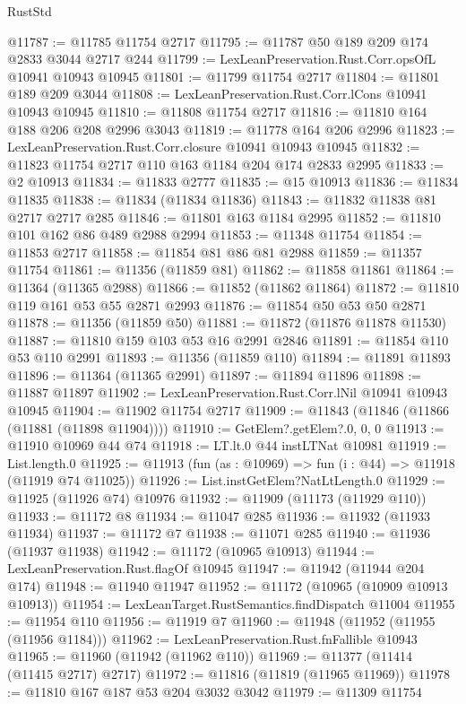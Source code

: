 \begin{lexlean}{RustStd}
\begin{coremodule}
@11787 := @11785 @11754 @2717
@11795 := @11787 @50 @189 @209 @174 @2833 @3044 @2717 @244
@11799 := LexLeanPreservation.Rust.Corr.opsOfL @10941 @10943 @10945
@11801 := @11799 @11754 @2717
@11804 := @11801 @189 @209 @3044
@11808 := LexLeanPreservation.Rust.Corr.lCons @10941 @10943 @10945
@11810 := @11808 @11754 @2717
@11816 := @11810 @164 @188 @206 @208 @2996 @3043
@11819 := @11778 @164 @206 @2996
@11823 := LexLeanPreservation.Rust.Corr.closure @10941 @10943 @10945
@11832 := @11823 @11754 @2717 @110 @163 @1184 @204 @174 @2833 @2995
@11833 := @2 @10913
@11834 := @11833 @2777
@11835 := @15 @10913
@11836 := @11834 @11835
@11838 := @11834 (@11834 @11836)
@11843 := @11832 @11838 @81 @2717 @2717 @285
@11846 := @11801 @163 @1184 @2995
@11852 := @11810 @101 @162 @86 @489 @2988 @2994
@11853 := @11348 @11754
@11854 := @11853 @2717
@11858 := @11854 @81 @86 @81 @2988
@11859 := @11357 @11754
@11861 := @11356 (@11859 @81)
@11862 := @11858 @11861
@11864 := @11364 (@11365 @2988)
@11866 := @11852 (@11862 @11864)
@11872 := @11810 @119 @161 @53 @55 @2871 @2993
@11876 := @11854 @50 @53 @50 @2871
@11878 := @11356 (@11859 @50)
@11881 := @11872 (@11876 @11878 @11530)
@11887 := @11810 @159 @103 @53 @16 @2991 @2846
@11891 := @11854 @110 @53 @110 @2991
@11893 := @11356 (@11859 @110)
@11894 := @11891 @11893
@11896 := @11364 (@11365 @2991)
@11897 := @11894 @11896
@11898 := @11887 @11897
@11902 := LexLeanPreservation.Rust.Corr.lNil @10941 @10943 @10945
@11904 := @11902 @11754 @2717
@11909 := @11843 (@11846 (@11866 (@11881 (@11898 @11904))))
@11910 := GetElem?.getElem?.{0, 0, 0}
@11913 := @11910 @10969 @44 @74
@11918 := LT.lt.{0} @44 instLTNat @10981
@11919 := List.length.{0}
@11925 := @11913 (fun (as : @10969) => fun (i : @44) => @11918 (@11919 @74 @11025))
@11926 := List.instGetElem?NatLtLength.{0}
@11929 := @11925 (@11926 @74) @10976
@11932 := @11909 (@11173 (@11929 @110))
@11933 := @11172 @8
@11934 := @11047 @285
@11936 := @11932 (@11933 @11934)
@11937 := @11172 @7
@11938 := @11071 @285
@11940 := @11936 (@11937 @11938)
@11942 := @11172 (@10965 @10913)
@11944 := LexLeanPreservation.Rust.flagOf @10945
@11947 := @11942 (@11944 @204 @174)
@11948 := @11940 @11947
@11952 := @11172 (@10965 (@10909 @10913 @10913))
@11954 := LexLeanTarget.RustSemantics.findDispatch @11004
@11955 := @11954 @110
@11956 := @11919 @7
@11960 := @11948 (@11952 (@11955 (@11956 @1184)))
@11962 := LexLeanPreservation.Rust.fnFallible @10943
@11965 := @11960 (@11942 (@11962 @110))
@11969 := @11377 (@11414 (@11415 @2717) @2717)
@11972 := @11816 (@11819 (@11965 @11969))
@11978 := @11810 @167 @187 @53 @204 @3032 @3042
@11979 := @11309 @11754

\end{coremodule}
\end{lexlean}
